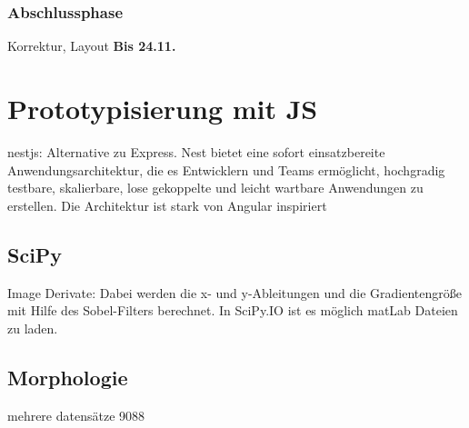 \subsubsection*{Abschlussphase}
Korrektur, Layout \textbf{Bis 24.11.}


\section{Prototypisierung mit JS}
nestjs: Alternative zu Express. Nest bietet eine sofort einsatzbereite Anwendungsarchitektur, die es Entwicklern und Teams ermöglicht, hochgradig testbare, skalierbare, lose gekoppelte und leicht wartbare Anwendungen zu erstellen. Die Architektur ist stark von Angular inspiriert

\subsection*{SciPy}
Image Derivate: Dabei werden die x- und y-Ableitungen und die Gradientengröße mit Hilfe des Sobel-Filters berechnet. 
In SciPy.IO ist es möglich matLab Dateien zu laden.


\subsection*{Morphologie}
mehrere datensätze 9088